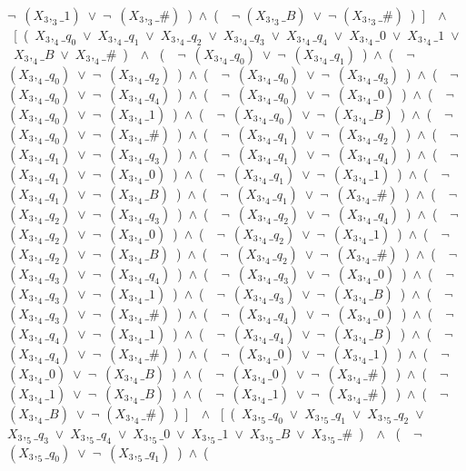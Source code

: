 ﻿\documentclass[a4paper,10pt]{article}
\begin{document}
$\neg$\ $(X_3,_3\_1)$\ $\vee$\ $\neg$\ $(X_3,_3\_\#)$\ )\ $\wedge$\ (\ \ $\neg$ $(X_3,_3\_B)$\ $\vee$\ $\neg$ $(X_3,_3\_\#)$\ )\ ]\ \ $\wedge$ \ [\ (\ $X_3,_4\_q_0$\ $\vee$\ $X_3,_4\_q_1$\ $\vee$\ $X_3,_4\_q_2$\ $\vee$\ $X_3,_4\_q_3$\ $\vee$\ $X_3,_4\_q_4$\ $\vee$\ $X_3,_4\_0$\ $\vee$\ $X_3,_4\_1$\ $\vee$\ $X_3,_4\_B$\ $\vee$\ $X_3,_4\_\#$\ )\ \ $\wedge$ \ (\ \ $\neg$\ $(X_3,_4\_q_0)$\ $\vee$\ $\neg$\ $(X_3,_4\_q_1)$\ )\ $\wedge$\ (\ \ $\neg$\ $(X_3,_4\_q_0)$\ $\vee$\ $\neg$\ $(X_3,_4\_q_2)$\ )\ $\wedge$\ (\ \ $\neg$\ $(X_3,_4\_q_0)$\ $\vee$\ $\neg$\ $(X_3,_4\_q_3)$\ )\ $\wedge$\ (\ \ $\neg$\ $(X_3,_4\_q_0)$\ $\vee$\ $\neg$\ $(X_3,_4\_q_4)$\ )\ $\wedge$\ (\ \ $\neg$\ $(X_3,_4\_q_0)$\ $\vee$\ $\neg$\ $(X_3,_4\_0)$\ )\ $\wedge$\ (\ \ $\neg$\ $(X_3,_4\_q_0)$\ $\vee$\ $\neg$\ $(X_3,_4\_1)$\ )\ $\wedge$\ (\ \ $\neg$\ $(X_3,_4\_q_0)$\ $\vee$\ $\neg$\ $(X_3,_4\_B)$\ )\ $\wedge$\ (\ \ $\neg$\ $(X_3,_4\_q_0)$\ $\vee$\ $\neg$\ $(X_3,_4\_\#)$\ )\ $\wedge$\ (\ \ $\neg$\ $(X_3,_4\_q_1)$\ $\vee$\ $\neg$\ $(X_3,_4\_q_2)$\ )\ $\wedge$\ (\ \ $\neg$\ $(X_3,_4\_q_1)$\ $\vee$\ $\neg$\ $(X_3,_4\_q_3)$\ )\ $\wedge$\ (\ \ $\neg$\ $(X_3,_4\_q_1)$\ $\vee$\ $\neg$\ $(X_3,_4\_q_4)$\ )\ $\wedge$\ (\ \ $\neg$\ $(X_3,_4\_q_1)$\ $\vee$\ $\neg$\ $(X_3,_4\_0)$\ )\ $\wedge$\ (\ \ $\neg$\ $(X_3,_4\_q_1)$\ $\vee$\ $\neg$\ $(X_3,_4\_1)$\ )\ $\wedge$\ (\ \ $\neg$\ $(X_3,_4\_q_1)$\ $\vee$\ $\neg$\ $(X_3,_4\_B)$\ )\ $\wedge$\ (\ \ $\neg$\ $(X_3,_4\_q_1)$\ $\vee$\ $\neg$\ $(X_3,_4\_\#)$\ )\ $\wedge$\ (\ \ $\neg$\ $(X_3,_4\_q_2)$\ $\vee$\ $\neg$\ $(X_3,_4\_q_3)$\ )\ $\wedge$\ (\ \ $\neg$\ $(X_3,_4\_q_2)$\ $\vee$\ $\neg$\ $(X_3,_4\_q_4)$\ )\ $\wedge$\ (\ \ $\neg$\ $(X_3,_4\_q_2)$\ $\vee$\ $\neg$\ $(X_3,_4\_0)$\ )\ $\wedge$\ (\ \ $\neg$\ $(X_3,_4\_q_2)$\ $\vee$\ $\neg$\ $(X_3,_4\_1)$\ )\ $\wedge$\ (\ \ $\neg$\ $(X_3,_4\_q_2)$\ $\vee$\ $\neg$\ $(X_3,_4\_B)$\ )\ $\wedge$\ (\ \ $\neg$\ $(X_3,_4\_q_2)$\ $\vee$\ $\neg$\ $(X_3,_4\_\#)$\ )\ $\wedge$\ (\ \ $\neg$\ $(X_3,_4\_q_3)$\ $\vee$\ $\neg$\ $(X_3,_4\_q_4)$\ )\ $\wedge$\ (\ \ $\neg$\ $(X_3,_4\_q_3)$\ $\vee$\ $\neg$\ $(X_3,_4\_0)$\ )\ $\wedge$\ (\ \ $\neg$\ $(X_3,_4\_q_3)$\ $\vee$\ $\neg$\ $(X_3,_4\_1)$\ )\ $\wedge$\ (\ \ $\neg$\ $(X_3,_4\_q_3)$\ $\vee$\ $\neg$\ $(X_3,_4\_B)$\ )\ $\wedge$\ (\ \ $\neg$\ $(X_3,_4\_q_3)$\ $\vee$\ $\neg$\ $(X_3,_4\_\#)$\ )\ $\wedge$\ (\ \ $\neg$\ $(X_3,_4\_q_4)$\ $\vee$\ $\neg$\ $(X_3,_4\_0)$\ )\ $\wedge$\ (\ \ $\neg$\ $(X_3,_4\_q_4)$\ $\vee$\ $\neg$\ $(X_3,_4\_1)$\ )\ $\wedge$\ (\ \ $\neg$\ $(X_3,_4\_q_4)$\ $\vee$\ $\neg$\ $(X_3,_4\_B)$\ )\ $\wedge$\ (\ \ $\neg$\ $(X_3,_4\_q_4)$\ $\vee$\ $\neg$\ $(X_3,_4\_\#)$\ )\ $\wedge$\ (\ \ $\neg$\ $(X_3,_4\_0)$\ $\vee$\ $\neg$\ $(X_3,_4\_1)$\ )\ $\wedge$\ (\ \ $\neg$\ $(X_3,_4\_0)$\ $\vee$\ $\neg$\ $(X_3,_4\_B)$\ )\ $\wedge$\ (\ \ $\neg$\ $(X_3,_4\_0)$\ $\vee$\ $\neg$\ $(X_3,_4\_\#)$\ )\ $\wedge$\ (\ \ $\neg$\ $(X_3,_4\_1)$\ $\vee$\ $\neg$\ $(X_3,_4\_B)$\ )\ $\wedge$\ (\ \ $\neg$\ $(X_3,_4\_1)$\ $\vee$\ $\neg$\ $(X_3,_4\_\#)$\ )\ $\wedge$\ (\ \ $\neg$ $(X_3,_4\_B)$\ $\vee$\ $\neg$ $(X_3,_4\_\#)$\ )\ ]\ \ $\wedge$ \ [\ (\ $X_3,_5\_q_0$\ $\vee$\ $X_3,_5\_q_1$\ $\vee$\ $X_3,_5\_q_2$\ $\vee$\ $X_3,_5\_q_3$\ $\vee$\ $X_3,_5\_q_4$\ $\vee$\ $X_3,_5\_0$\ $\vee$\ $X_3,_5\_1$\ $\vee$\ $X_3,_5\_B$\ $\vee$\ $X_3,_5\_\#$\ )\ \ $\wedge$ \ (\ \ $\neg$\ $(X_3,_5\_q_0)$\ $\vee$\ $\neg$\ $(X_3,_5\_q_1)$\ )\ $\wedge$\ (\ 
\end{document}
